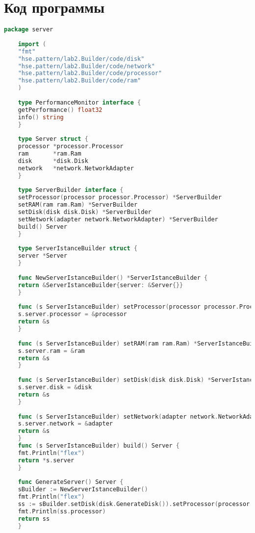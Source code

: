 \documentclass[PI,LAB]{HSEUniversity}
\begin{document}
    \section{Код программы}
    \lstset{extendedchars=\true}
    \begin{lstlisting}[language=Go]
    package server
    
    import (
    "fmt"
    "hse.pattern/lab2.Builder/code/disk"
    "hse.pattern/lab2.Builder/code/network"
    "hse.pattern/lab2.Builder/code/processor"
    "hse.pattern/lab2.Builder/code/ram"
    )
    
    type PerformanceMonitor interface {
    getPerformance() float32
    info() string
    }
    
    type Server struct {
    processor *processor.Processor
    ram       *ram.Ram
    disk      *disk.Disk
    network   *network.NetworkAdapter
    }
    
    type ServerBuilder interface {
    setProcessor(processor processor.Processor) *ServerBuilder
    setRAM(ram ram.Ram) *ServerBuilder
    setDisk(disk disk.Disk) *ServerBuilder
    setNetwork(adapter network.NetworkAdapter) *ServerBuilder
    build() Server
    }
    
    type ServerIstanceBuilder struct {
    server *Server
    }
    
    func NewServerIstanceBuilder() *ServerIstanceBuilder {
    return &ServerIstanceBuilder{server: &Server{}}
    }
    
    func (s ServerIstanceBuilder) setProcessor(processor processor.Processor) *ServerIstanceBuilder {
    s.server.processor = &processor
    return &s
    }
    
    func (s ServerIstanceBuilder) setRAM(ram ram.Ram) *ServerIstanceBuilder {
    s.server.ram = &ram
    return &s
    }
    
    func (s ServerIstanceBuilder) setDisk(disk disk.Disk) *ServerIstanceBuilder {
    s.server.disk = &disk
    return &s
    }
    
    func (s ServerIstanceBuilder) setNetwork(adapter network.NetworkAdapter) *ServerIstanceBuilder {
    s.server.network = &adapter
    return &s
    }
    func (s ServerIstanceBuilder) build() Server {
    fmt.Println("flex")
    return *s.server
    }
    
    func GenerateServer() Server {
    sBuilder := NewServerIstanceBuilder()
    fmt.Println("flex")
    ss := sBuilder.setDisk(disk.GenerateDisk()).setProcessor(processor.GenerateProcessor()).setNetwork(network.GenerateNetwork()).setRAM(ram.GenerateRam()).build()
    fmt.Println(ss.processor)
    return ss
    }
    
    \end{lstlisting}
\end{document}
